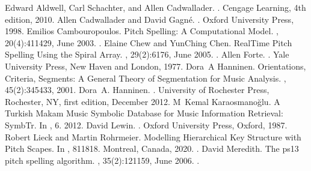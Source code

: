 \documentclass[letterpaper,10pt,english]{sphinxmanual}
\begin{document}
\begin{sphinxthebibliography}{10}
Edward Aldwell, Carl Schachter, and Allen Cadwallader. . Cengage Learning, 4th edition, 2010.
Allen Cadwallader and David Gagné. . Oxford University Press, 1998.
Emilios Cambouropoulos. Pitch Spelling: A Computational Model. , 20(4):411\textendash{}429, June 2003. .
Elaine Chew and Yun\sphinxhyphen{}Ching Chen. Real\sphinxhyphen{}Time Pitch Spelling Using the Spiral Array. , 29(2):61\textendash{}76, June 2005. .
Allen Forte. . Yale University Press, New Haven and London, 1977.
Dora A Hanninen. Orientations, Criteria, Segments: A General Theory of Segmentation for Music Analysis. , 45(2):345\textendash{}433, 2001.
Dora A. Hanninen. . University of Rochester Press, Rochester, NY, first edition, December 2012.
M Kemal Karaosmanoğlu. A Turkish Makam Music Symbolic Database for Music Information Retrieval: SymbTr. In , 6. 2012.
David Lewin. . Oxford University Press, Oxford, 1987.
Robert Lieck and Martin Rohrmeier. Modelling Hierarchical Key Structure with Pitch Scapes. In , 811\textendash{}818. Montreal, Canada, 2020. .
David Meredith. The ps13 pitch spelling algorithm. , 35(2):121\textendash{}159, June 2006. .

\end{sphinxthebibliography}
\end{document}
